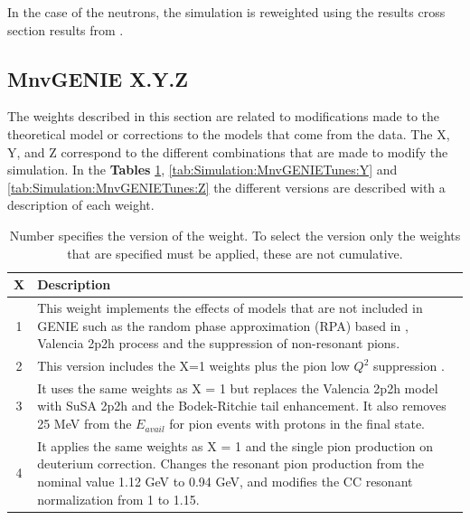 In the case of the neutrons, the simulation is reweighted using the results cross section results from \cite{ElkinsNeutronsPhysRevD.100.052002}.

\subsection{MnvGENIE X.Y.Z}
\label{Cap:Simulation:MnvGENIETunes:MnvTunesXYZ}
The weights described in this section are related to modifications made to the theoretical model or corrections to the models that come from the data. The X, Y, and Z correspond to the different combinations that are made to modify the simulation. 
In the \textbf{Tables} \ref{tab:Simulation:MnvGENIETunes:X}, \ref{tab:Simulation:MnvGENIETunes:Y} and \ref{tab:Simulation:MnvGENIETunes:Z} the different versions are described with a description of each weight. 

\begin{table}[!htb]
    \centering
    \begin{tabular}{c|p{4.5in}}
        \textbf{X} & \textbf{Description} \\ \hline
        1 & This weight implements the effects of models that are not included in GENIE such as the random phase approximation (RPA) based in \cite{RPAPhysRevC.70.055503}\cite{RPAgran2017model}, Valencia 2p2h process \cite{2p2hPhysRevC.83.045501}\cite{2p2hGran_2013}\cite{2p2hRodrigues_2016} and the suppression of non-resonant pions\cite{Rodrigues_2016}. \\ \hline
        2 & This version includes the X=1 weights plus the pion low $Q^2$ suppression \cite{LowQ2PhysRevD.100.072005}.  \\ \hline
        3 & It uses the same weights as X = 1 but replaces the Valencia 2p2h model with SuSA 2p2h\cite{SuSAPhysRevC.38.1801} and the Bodek-Ritchie tail enhancement\cite{Alvarez_Ruso_2021}. It also removes 25 MeV from the $E_{avail}$ for pion events with protons in the final state. \\ \hline
        4 & It applies the same weights as X = 1 and the single pion production on deuterium correction. Changes the resonant pion production from the nominal value 1.12 GeV to 0.94 GeV, and modifies the CC resonant normalization from 1 to 1.15.  \\ 
    \end{tabular}
    \caption{Number specifies the version of the weight. To select the version only the weights that are specified must be applied, these are not cumulative. }
    \label{tab:Simulation:MnvGENIETunes:X}
\end{table}

